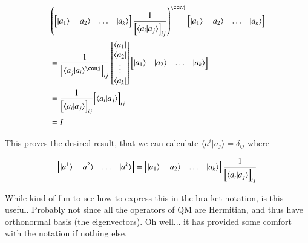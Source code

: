 \documentclass{article}
\newcommand{\ket}[1]{\lvert {#1} \rangle}
\newcommand{\bra}[1]{\langle {#1} \rvert}
\newcommand{\braket}[2]{\langle{#1} \vert {#2}\rangle}
\begin{document}
\begin{align*}
&\left(
\begin{bmatrix}
\ket{a_1} & \ket{a_2} & \hdots & \ket{a_k}
\end{bmatrix}
\inv{{\begin{bmatrix}
\braket{a_i}{a_j}
\end{bmatrix}}_{ij}} \right)^\conj
\begin{bmatrix}
\ket{a_1} & \ket{a_2} & \hdots & \ket{a_k}
\end{bmatrix} \\
&=
\inv{{\begin{bmatrix}
\braket{a_j}{a_i}^\conj
\end{bmatrix}}_{ij}} 
\begin{bmatrix}
\bra{a_1} \\ \bra{a_2} \\ \vdots \\ \bra{a_k}
\end{bmatrix}
\begin{bmatrix}
\ket{a_1} & \ket{a_2} & \hdots & \ket{a_k}
\end{bmatrix} \\
&=
\inv{{\begin{bmatrix}
\braket{a_i}{a_j}
\end{bmatrix}}_{ij}} 
{{\begin{bmatrix}
\braket{a_i}{a_j}
\end{bmatrix}}_{ij}} \\
&= I
\end{align*}

This proves the desired result, that we can calculate $\braket{a^i}{a_j} = \delta_{ij}$ where 

\begin{align*}
\begin{bmatrix}
\ket{a^1} & \ket{a^2} & \hdots & \ket{a^k}
\end{bmatrix} = 
\begin{bmatrix}
\ket{a_1} & \ket{a_2} & \hdots & \ket{a_k}
\end{bmatrix}
\inv{{\begin{bmatrix}
\braket{a_i}{a_j}
\end{bmatrix}}_{ij}}
\end{align*}

While kind of fun to see how to express this in the bra ket notation, is this useful.  Probably not since
all the operators of QM are Hermitian, and thus have orthonormal basis (the eigenvectors).  Oh well... it has
provided some comfort with the notation if nothing else.
\end{document}
